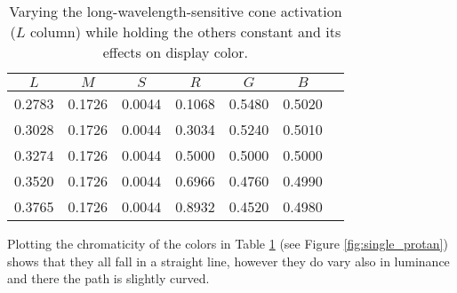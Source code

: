 \documentclass[twocolumn]{article}
\newif\ifinvert
\begin{document}
\begin{table}[h]
    \begin{tabular}{c|c|c|c|c|c|c}
        \hline
        $L$ & $M$ & $S$ & $R$ & $G$ & $B$\\
        \hline
        0.2783 & 0.1726 & 0.0044 & 0.1068 & 0.5480 & 0.5020 & \cellcolor{l1}\\
        0.3028 & 0.1726 & 0.0044 & 0.3034 & 0.5240 & 0.5010 & \cellcolor{l2}\\
        0.3274 & 0.1726 & 0.0044 & 0.5000 & 0.5000 & 0.5000 & \cellcolor{l3}\\
        0.3520 & 0.1726 & 0.0044 & 0.6966 & 0.4760 & 0.4990 & \cellcolor{l4}\\
        0.3765 & 0.1726 & 0.0044 & 0.8932 & 0.4520 & 0.4980 & \cellcolor{l5}
    \end{tabular}
    \caption{Varying the long-wavelength-sensitive cone activation ($L$ column) while holding the others constant and its effects on display color.}\label{table:varying_l_cone_activation}
\end{table}

Plotting the chromaticity of the colors in Table \ref{table:varying_l_cone_activation} (see Figure \ref{fig:single_protan}) shows that they all fall in a straight line, however they do vary also in luminance and there the path is slightly curved.\\
\begin{figure*}[h]
    \ifinvert
        
    \else
        
    \fi
    \caption{The colors from Table \ref{table:varying_l_cone_activation} are plotted in chromaticity space (left) and chromoluminance space (right).  While the changes in long-wavelength-sensitive cone activation result in a straight line path in chromaticity, there are also changes in luminance that follow a slightly curved path.  IMAGE LINK, CODE LINK}\label{fig:single_protan}
\end{figure*}
\end{document}
